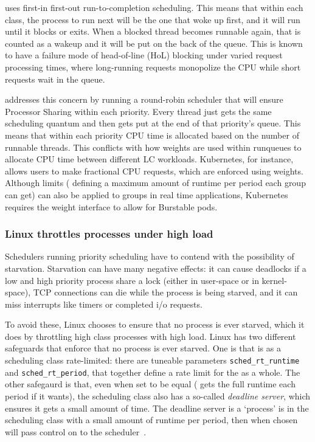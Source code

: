 \schedfifo{} uses first-in first-out run-to-completion scheduling. This means
that within each class, the process to run next will be the one that woke up
first, and it will run until it blocks or exits. When a blocked thread becomes
runnable again, that is counted as a wakeup and it will be put on the back of
the queue. This is known to have a failure mode of head-of-line (HoL) blocking
under varied request processing times, where long-running requests monopolize
the CPU while short requests wait in the queue.

\schedrr{} addresses this concern by running a round-robin scheduler that will
ensure Processor Sharing within each priority. Every thread just gets the same
scheduling quantum and then gets put at the end of that priority's queue. This
means that within each priority CPU time is allocated based on the number of
runnable threads. This conflicts with how weights are used within runqueues to
allocate CPU time between different LC workloads. Kubernetes, for instance,
allows users to make fractional CPU requests, which are enforced using weights.
Although \cgroups{} limits (\ie{} defining a maximum amount of runtime per
period each group can get) can also be applied to groups in real time
applications, Kubernetes requires the weight interface to allow for Burstable
pods.

\subsubsection{Linux throttles \rtclass{} processes under high load
}\label{sss:approach:linux:starve-throttle}

Schedulers running priority scheduling have to contend with the possibility of
starvation. Starvation can have many negative effects: it can cause deadlocks if
a low and high priority process share a lock (either in user-space or in
kernel-space), TCP connections can die while the process is being starved, and
it can miss interrupts like timers or completed i/o requests.

To avoid these, Linux chooses to ensure that no process is ever starved, which
it does by throttling high class processes with high load. Linux has two
different safeguards that enforce that no process is ever starved. One is that
\rtclass{} is as a scheduling class rate-limited: there are tuneable parameters
\texttt{sched\_rt\_runtime} and \texttt{sched\_rt\_period}, that together define
a rate limit for the \rtclass{} as a whole. The other safegaurd is that, even
when set to be equal (\ie{} \rtclass{} gets the full runtime each period if it
wants), the \normalclass{} scheduling class also has a so-called
\textit{deadline server}, which ensures it gets a small amount of time. The
deadline server is a `process' is in the \deadlineclass{} scheduling class with
a small amount of runtime per period, then when chosen will pass control on to
the \normalclass{} scheduler~\cite{lkml-deadline-srv}.

